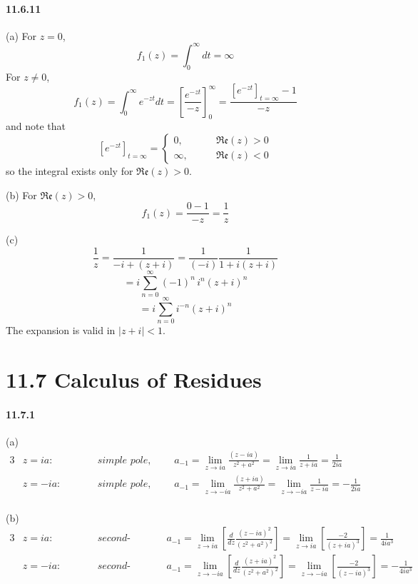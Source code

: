 \documentclass[a4paper]{article}
\begin{document}
\paragraph{11.6.11}
(a) For $z=0$, 
\[
f_1(z)=\int_0^\infty dt=\infty
\]
For $z\neq0$,
\[
f_1(z)=\int_0^\infty e^{-zt}dt=\left[\frac{e^{-zt}}{-z} \right]_0^\infty=\frac{\left[e^{-zt}\right]_{t=\infty}-1}{-z}
\]
and note that
\[
\left[e^{-zt}\right]_{t=\infty}=
\begin{cases}
0,\qquad & \mathfrak{Re}(z)>0\\
\infty,\qquad & \mathfrak{Re}(z)<0
\end{cases}
\]
so the integral exists only for $\mathfrak{Re}(z)>0$.
\medskip

(b) For $\mathfrak{Re}(z)>0$,
\[
f_1(z)=\frac{0-1}{-z}=\frac{1}{z}
\]

(c)
\[
\frac{1}{z}=\frac{1}{-i+(z+i)}=\frac{1}{(-i)}\frac{1}{1+i(z+i)}
\]
\[
=i\sum_{n=0}^\infty(-1)^n\,i^n(z+i)^n\]
\[=i\sum_{n=0}^\infty i^{-n}(z+i)^n
\]
The expansion is valid in $|z+i|<1$.

\section*{11.7 Calculus of Residues}

\paragraph{11.7.1 }
(a)
\begin{alignat*}{3}
    & z=ia:\qquad && \textit{simple pole,}\qquad && a_{-1}=\lim_{z\to ia}\frac{(z-ia)}{z^2+a^2}=\lim_{z\to ia}\frac{1}{z+ia}=\frac{1}{2ia}\\
    & z=-ia:\qquad && \textit{simple pole,}\qquad && a_{-1}=\lim_{z\to -ia}\frac{(z+ia)}{z^2+a^2}=\lim_{z\to -ia}\frac{1}{z-ia}=-\frac{1}{2ia}\\
\end{alignat*}

(b)
\begin{alignat*}{3}
    & z=ia:\qquad && \textit{second-order pole,}\qquad && a_{-1}=\lim_{z\to ia}\left[\frac{d}{dz}\frac{(z-ia)^2}{(z^2+a^2)^2} \right]=\lim_{z\to ia}\left[\frac{-2}{(z+ia)^3} \right]=\frac{1}{4ia^3}\\
    & z=-ia:\qquad && \textit{second-order pole,}\qquad && a_{-1}=\lim_{z\to -ia}\left[\frac{d}{dz}\frac{(z+ia)^2}{(z^2+a^2)^2} \right]=\lim_{z\to -ia}\left[\frac{-2}{(z-ia)^3} \right]=-\frac{1}{4ia^3}
\end{alignat*}
\end{document}
